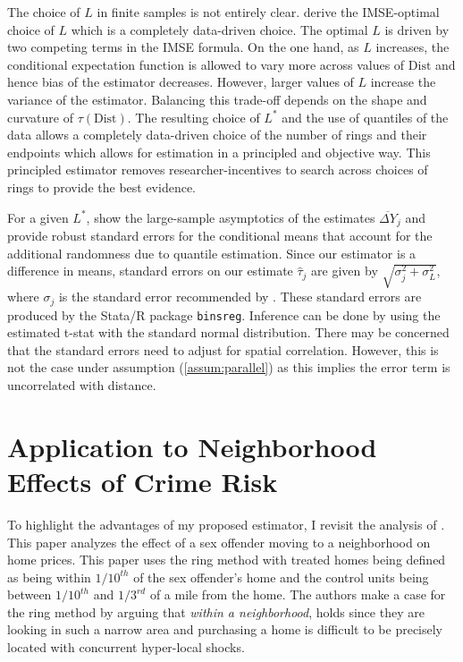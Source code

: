 \documentclass[10pt]{article}
\newcommand{\dist}{\text{Dist}}
\begin{document}
The choice of $L$ in finite samples is not entirely clear. \citet{Cattaneo_Crump_Farrell_Feng_2019} derive the IMSE-optimal choice of $L$ which is a completely data-driven choice. The optimal $L$ is driven by two competing terms in the IMSE formula. On the one hand, as $L$ increases, the conditional expectation function is allowed to vary more across values of $\dist$ and hence bias of the estimator decreases. However, larger values of $L$ increase the variance of the estimator. Balancing this trade-off depends on the shape and curvature of $\tau(\dist)$. The resulting choice of $L^*$ and the use of quantiles of the data allows a completely data-driven choice of the number of rings and their endpoints which allows for estimation in a principled and objective way. This principled estimator removes researcher-incentives to search across choices of rings to provide the best evidence. 

For a given $L^*$, \citet{Cattaneo_Crump_Farrell_Feng_2019} show the large-sample asymptotics of the estimates $\overline{\Delta Y}_j$ and provide robust standard errors for the conditional means that account for the additional randomness due to quantile estimation. Since our estimator is a difference in means, standard errors on our estimate $\hat{\tau}_j$ are given by $\sqrt{\sigma^2_j + \sigma^2_L}$, where $\sigma_j$ is the standard error recommended by \citet{Cattaneo_Crump_Farrell_Feng_2019}. These standard errors are produced by the Stata/R package \texttt{binsreg}. Inference can be done by using the estimated t-stat with the standard normal distribution. There may be concerned that the standard errors need to adjust for spatial correlation. However, this is not the case under assumption (\ref{assum:parallel}) as this implies the error term is uncorrelated with distance.




\section{Application to Neighborhood Effects of Crime Risk}

To highlight the advantages of my proposed estimator, I revisit the analysis of \citet{Linden_Rockoff_2008}. This paper analyzes the effect of a sex offender moving to a neighborhood on home prices. This paper uses the ring method with treated homes being defined as being within $1/10^{th}$ of the sex offender's home and the control units being between $1/10^{th}$ and $1/3^{rd}$ of a mile from the home. The authors make a case for the ring method by arguing that \emph{within a neighborhood},  holds since they are looking in such a narrow area and purchasing a home is difficult to be precisely located with concurrent hyper-local shocks. 
\end{document}

